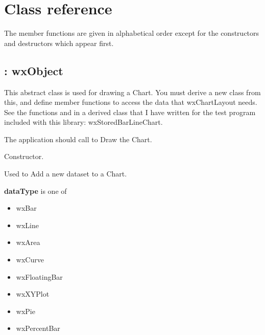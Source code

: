 \chapter{Class reference}%
%
\setfooter{\thepage}{}{}{}{}{\thepage}

The member functions are given in alphabetical order except for the
constructors and destructors which appear first.

\section{: wxObject}

This abstract class is used for drawing a Chart. You must derive a new
class from this, and define member functions to access the data that
wxChartLayout needs. See the functions \rtfsp
and  in a derived class that
I have written for the test program included with this library: wxStoredBarLineChart.

The application should call  to Draw the Chart.

\label{wxchartlayout}


Constructor.

\label{adddataset}



Used to Add a new dataset to a Chart. 

{\bf dataType} is one of 

\begin{itemize}\itemsep=0pt
\item wxBar
\item wxLine
\item wxArea
\item wxCurve
\item wxFloatingBar
\item wxXYPlot
\item wxPie
\item wxPercentBar
\end{itemize}

